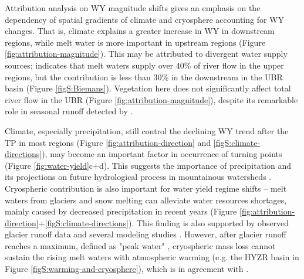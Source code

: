 \documentclass[hess, manuscript]{copernicus}
\begin{document}
Attribution analysis on WY magnitude shifts gives an emphasis on the dependency of spatial gradients of climate and cryosphere accounting for WY changes. 
That is, climate explains a greater increase in WY in downstream regions, while melt water is more important in upstream regions (Figure \ref{fig:attribution-magnitude}). 
This may be attributed to divergent water supply sources; \citet{biemans2019importance} indicates that melt waters supply over 40\% of river flow in the upper regions, but the contribution is less than 30\% in the downstream in the UBR basin (Figure \ref{figS:Biemans}). 
Vegetation here does not significantly affect total river flow in the UBR (Figure \ref{fig:attribution-magnitude}), despite its remarkable role in seasonal runoff detected by \citet{li2021vegetation}. 

Climate, especially precipitation, still control the declining WY trend after the TP in most regions (Figure \ref{fig:attribution-direction} and \ref{figS:climate-directions}), may become an important factor in occurrence of turning points (Figure \ref{fig:water-yield}c+d).
This suggests the importance of precipitation and its projections on future hydrological process in mountainous watersheds \citep{lutz2014consistent}. 
Cryospheric contribution is also important for water yield regime shifts -- melt waters from glaciers and snow melting can alleviate water resources shortages, mainly caused by decreased precipitation in recent years (Figure \ref{fig:attribution-direction}+\ref{figS:climate-directions}). This finding is also supported by observed glacier runoff data \citep{yao2010glacial} and several modeling studies \citep{lutz2014consistent, Zhang2020VariationOM, wang2021tp}. 
However, after glacier runoff reaches a maximum, defined as "peak water" \citep{gleick2010peak}, cryospheric mass loss cannot sustain the rising melt waters with atmospheric warming (e.g. the HYZR basin in Figure \ref{figS:warming-and-cryosphere}), which is in agreement with \citet{huss2018global}. 
\end{document}
